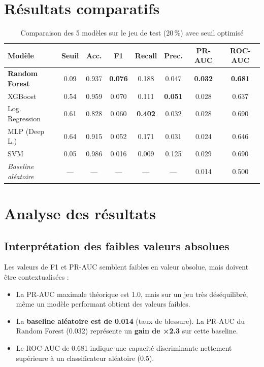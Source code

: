 \documentclass[12pt,a4paper]{report}
\begin{document}
\section{Résultats comparatifs}

\begin{table}[H]
\centering
\begin{tabular}{lccccccc}
\toprule
\textbf{Modèle} & \textbf{Seuil} & \textbf{Acc.} & \textbf{F1} & \textbf{Recall} & \textbf{Prec.} & \textbf{PR-AUC} & \textbf{ROC-AUC} \\
\midrule
\rowcolor{green!8}\textbf{Random Forest} & 0.09 & 0.937 & \textbf{0.076} & 0.188 & 0.047 & \textbf{0.032} & \textbf{0.681} \\
XGBoost & 0.54 & 0.959 & 0.070 & 0.111 & \textbf{0.051} & 0.028 & 0.637 \\
Log. Regression & 0.61 & 0.828 & 0.060 & \textbf{0.402} & 0.032 & 0.028 & 0.690 \\
MLP (Deep L.) & 0.64 & 0.915 & 0.052 & 0.171 & 0.031 & 0.024 & 0.646 \\
SVM & 0.05 & 0.986 & 0.016 & 0.009 & 0.125 & 0.029 & 0.690 \\
\midrule
\textit{Baseline aléatoire} & — & — & — & — & — & 0.014 & 0.500 \\
\bottomrule
\end{tabular}
\caption{Comparaison des 5 modèles sur le jeu de test (20\,\%) avec seuil optimisé}
\end{table}

\section{Analyse des résultats}

\subsection{Interprétation des faibles valeurs absolues}

Les valeurs de F1 et PR-AUC semblent faibles en valeur absolue, mais doivent être
contextualisées :
\begin{itemize}
  \item La PR-AUC maximale théorique est 1.0, mais sur un jeu très déséquilibré,
        même un modèle performant obtient des valeurs faibles.
  \item La \textbf{baseline aléatoire est de 0.014} (taux de blessure). La PR-AUC du
        Random Forest (0.032) représente un \textbf{gain de ×2.3} sur cette baseline.
  \item Le ROC-AUC de 0.681 indique une capacité discriminante nettement supérieure à
        un classificateur aléatoire (0.5).
\end{itemize}
\end{document}
